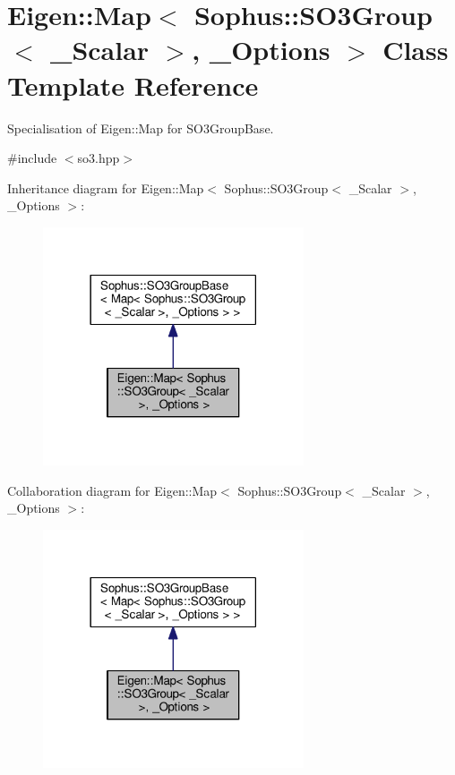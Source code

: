 \hypertarget{class_eigen_1_1_map_3_01_sophus_1_1_s_o3_group_3_01___scalar_01_4_00_01___options_01_4}{}\section{Eigen\+:\+:Map$<$ Sophus\+:\+:S\+O3\+Group$<$ \+\_\+\+Scalar $>$, \+\_\+\+Options $>$ Class Template Reference}
\label{class_eigen_1_1_map_3_01_sophus_1_1_s_o3_group_3_01___scalar_01_4_00_01___options_01_4}


Specialisation of Eigen\+::\+Map for S\+O3\+Group\+Base.  




{\ttfamily \#include $<$so3.\+hpp$>$}



Inheritance diagram for Eigen\+:\+:Map$<$ Sophus\+:\+:S\+O3\+Group$<$ \+\_\+\+Scalar $>$, \+\_\+\+Options $>$\+:
\nopagebreak
\begin{figure}[H]
\begin{center}
\leavevmode
\includegraphics[width=218pt]{class_eigen_1_1_map_3_01_sophus_1_1_s_o3_group_3_01___scalar_01_4_00_01___options_01_4__inherit__graph}
\end{center}
\end{figure}


Collaboration diagram for Eigen\+:\+:Map$<$ Sophus\+:\+:S\+O3\+Group$<$ \+\_\+\+Scalar $>$, \+\_\+\+Options $>$\+:
\nopagebreak
\begin{figure}[H]
\begin{center}
\leavevmode
\includegraphics[width=218pt]{class_eigen_1_1_map_3_01_sophus_1_1_s_o3_group_3_01___scalar_01_4_00_01___options_01_4__coll__graph}
\end{center}
\end{figure}
